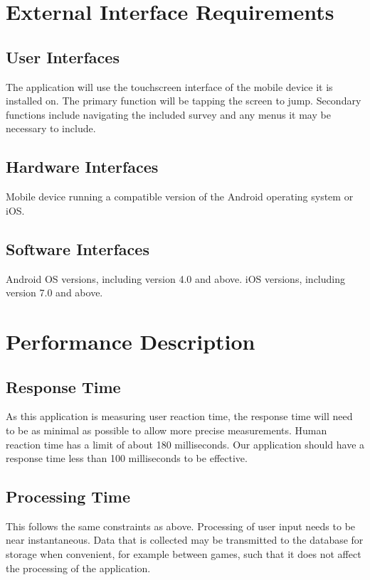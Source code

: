 \documentclass[a4wide]{article}
\begin{document}

\section{External Interface Requirements}

\subsection{User Interfaces}

The application will use the touchscreen interface of the mobile device it is
installed on.  The primary function will be tapping the screen to jump.
Secondary functions include navigating the included survey and any menus it may
be necessary to include.

\subsection{Hardware Interfaces}

Mobile device running a compatible version of the Android operating system or
iOS.


\subsection{Software Interfaces}

Android OS versions, including version 4.0 and above.
iOS versions, including version 7.0 and above.



\section{Performance Description}

\subsection{Response Time}
As this application is measuring user reaction time, the response time will need
to be as minimal as possible to allow more precise measurements.  Human reaction
time has a limit of about 180 milliseconds.  Our application should have a
response time less than 100 milliseconds to be effective.

\subsection{Processing Time}
This follows the same constraints as above.  Processing of user input needs to
be near instantaneous.  Data that is collected may be transmitted to the
database for storage when convenient, for example between games, such that it
does not affect the processing of the application.
\end{document}

